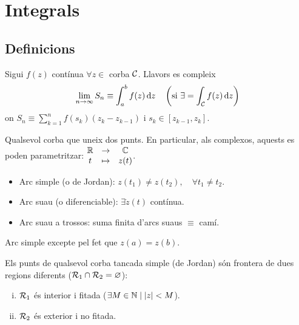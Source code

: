 \section{Integrals}
\subsection{Definicions}
\begin{defi}
    Sigui $f(z)$ contínua $\forall z \in$ corba $\mathcal{C}$. Llavors es compleix
    \begin{align}
        \lim_{n \to \infty} S_{n} \equiv \int_{a}^{b} f(z) \mathop{}\!\mathrm{d} z \quad  \left( \text{si } \exists = \int_{\mathcal{C}} f(z) \mathop{}\!\mathrm{d} z \right)
    \end{align}
    on $S_{n} \equiv \displaystyle \sum_{k=1}^{n} f(s_{k}) (z_{k} - z_{k-1})$ i $s_{k} \in [z_{k-1}, z_{k}]$.
\end{defi}

\begin{defi}[Arc]
    Qualsevol corba que uneix dos punts. En particular, als complexos, aquests es poden parametritzar: $\begin{matrix} \mathbb{R} & \to & \mathbb{C} \\ t & \mapsto & z(t) \end{matrix}$.
    \begin{itemize}
        \item Arc simple (o de Jordan): $z(t_{1}) \neq z(t_{2}), \quad \forall t_{1} \neq t_{2}$.
        \item Arc suau (o diferenciable): $\exists \dot{z}(t)$ contínua.
        \item Arc suau a trossos: suma finita d'arcs suaus $\equiv$ camí.
    \end{itemize}
\end{defi}

\begin{defi}
    Arc simple excepte pel fet que $z(a) = z(b)$.
\end{defi}

\begin{thm}[de Jordan]
    Els punts de qualsevol corba tancada simple (de Jordan) són frontera de dues regions diferents ($\mathcal{R}_{1} \cap \mathcal{R}_{2} = \varnothing$):
    \begin{enumerate}[i)]
        \item $\mathcal{R}_{1}$ és interior i fitada ($\exists M \in \mathbb{N} \mid \left| z \right| < M$).
        \item $\mathcal{R}_{2}$ és exterior i no fitada.
    \end{enumerate}
\end{thm}

